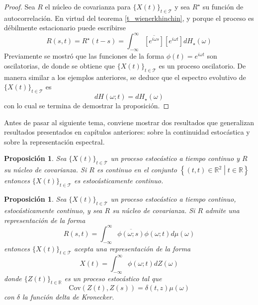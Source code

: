 \documentclass[12pt,letterpaper]{book}
\newtheorem{proposicion}[teorema]{Proposición}
\newcommand{\R}{\mathbb{R}}
\newcommand{\intR}{\int_{-\infty}^{\infty}}
\newcommand{\Cov}[1]{\mathrm{Cov}\left( #1 \right)}
\newcommand{\abso}[1]{\left| #1 \right|}
\newcommand{\xt}{$\{X(t)\}_{t\in \mathcal{T}}$ }
\newcommand{\talque}{\mathrel{}\middle|\mathrel{}}
\begin{document}
\begin{proof}
Sea $R$ el núcleo de covarianza para \xt y sea $R^\star$ su función de autocorrelación. 
En virtud del teorema \ref{t_wienerkhinchin}, y porque el proceso es débilmente estacionario
puede escribirse
\begin{equation}
R(s,t) = R^\star({t-s}) 
= \intR  \overline{\left[e^{i \omega {s}}\right]} \left[e^{i \omega {t}}\right]  dH_\star(\omega)
\end{equation}
Previamente se mostró que las funciones de la forma $\phi(t) = e^{i \omega t}$ son oscilatorias, de donde se obtiene que \xt es un proceso oscilatorio.
%
De manera similar a los ejemplos anteriores, se deduce que el espectro evolutivo de \xt es
\begin{equation}
dH(\omega; t) = dH_\star(\omega)
\end{equation}
con lo cual se termina de demostrar la proposición.
\end{proof}

Antes de pasar al siguiente tema, conviene mostrar dos resultados que generalizan resultados presentados en capítulos anteriores: sobre la continuidad estocástica y sobre la representación espectral.

\begin{proposicion}
Sea \xt un proceso estocástico a tiempo continuo y $R$ su núcleo de covarianza.
%
Si $R$ es continuo en el conjunto $\left\{ (t,t) \in \R^2 \talque t\in \R \right\}$ entonces \xt es estocásticamente continuo.
\end{proposicion}

\begin{proposicion}
Sea \xt un proceso estocástico a tiempo continuo, estocásticamente continuo,  y sea $R$ su núcleo de covarianza.
%
Si $R$ admite una representación de la forma
\begin{equation}
R(s,t) = \intR \overline{\phi(\omega;s)}\phi(\omega;t) d\mu(\omega)
\end{equation}
entonces \xt acepta una representación de la forma
\begin{equation}
X(t) = \intR \phi(\omega; t) dZ(\omega)
\end{equation}
donde $\{ Z(t) \}_{t\in \R}$ es un proceso estocástico tal que
\begin{equation}
\Cov{Z(t),Z(s)} = \delta(t,z) \mu(\omega)
\end{equation}
con $\delta$ la función delta de Kronecker.
\end{proposicion}
\end{document}

